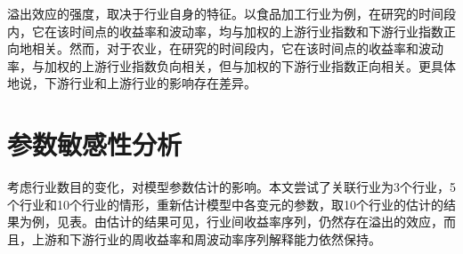 \documentclass{sysuthesis}
\begin{document}
溢出效应的强度，取决于行业自身的特征。以食品加工行业为例，在研究的时间段内，它在该时间点的收益率和波动率，均与加权的上游行业指数和下游行业指数正向地相关。然而，对于农业，在研究的时间段内，它在该时间点的收益率和波动率，与加权的上游行业指数负向相关，但与加权的下游行业指数正向相关。更具体地说，下游行业和上游行业的影响存在差异。

\section{参数敏感性分析}

考虑行业数目的变化，对模型参数估计的影响。本文尝试了关联行业为3个行业，5个行业和10个行业的情形，重新估计模型中各变元的参数，取10个行业的估计的结果为例，见表。由估计的结果可见，行业间收益率序列，仍然存在溢出的效应，而且，上游和下游行业的周收益率和周波动率序列解释能力依然保持。
\end{document}
